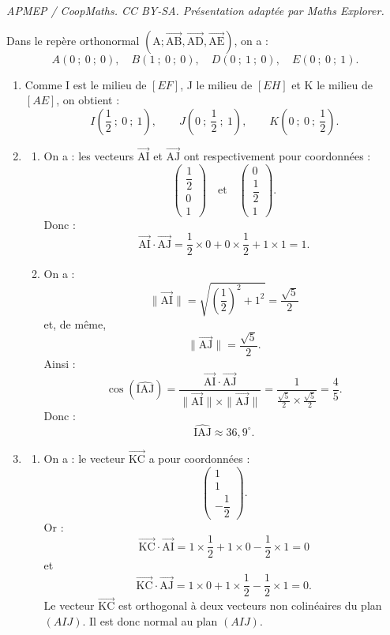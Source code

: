\documentclass[10pt]{article}
\providecommand{\vectt}[1]{\overrightarrow{\mathrm{#1}}}
\begin{document}
\noindent\textit{APMEP / CoopMaths. CC BY-SA. Présentation adaptée par Maths Explorer.}\par\medskip
Dans le repère orthonormal $\left(\mathrm{A};\vectt{AB},\vectt{AD},\vectt{AE}\right)$, on a :
\[
A(0~;~0~;~0),\quad B(1~;~0~;~0),\quad D(0~;~1~;~0),\quad E(0~;~0~;~1).
\]

\begin{enumerate}
	\item Comme I est le milieu de $[EF]$, J le milieu de $[EH]$ et K le milieu de $[AE]$, on obtient :
	\[
	I\left(\dfrac12~;~0~;~1\right),\qquad
	J\left(0~;~\dfrac12~;~1\right),\qquad
	K\left(0~;~0~;~\dfrac12\right).
	\]

	\item \begin{enumerate}
		\item On a :
		les vecteurs $\vectt{AI}$ et $\vectt{AJ}$ ont respectivement pour coordonnées :
		\[
		\begin{pmatrix}\dfrac12\\0\\1\end{pmatrix}
		\quad\text{et}\quad
		\begin{pmatrix}0\\\dfrac12\\1\end{pmatrix}.
		\]
		Donc :
		\[
		\vectt{AI}\cdot\vectt{AJ}
		=\dfrac12\times 0+0\times\dfrac12+1\times 1=1.
		\]

		\item On a :
		\[
		\|\vectt{AI}\|=\sqrt{\left(\dfrac12\right)^2+1^2}=\dfrac{\sqrt5}{2}
		\]
		et, de même,
		\[
		\|\vectt{AJ}\|=\dfrac{\sqrt5}{2}.
		\]
		Ainsi :
		\[
		\cos\left(\widehat{\mathrm{IAJ}}\right)
		=\dfrac{\vectt{AI}\cdot\vectt{AJ}}{\|\vectt{AI}\|\times \|\vectt{AJ}\|}
		=\dfrac{1}{\frac{\sqrt5}{2}\times \frac{\sqrt5}{2}}
		=\dfrac45.
		\]
		Donc :
		\[
		\widehat{\mathrm{IAJ}}\approx 36,9^\circ.
		\]
	\end{enumerate}

	\item \begin{enumerate}
		\item On a :
		le vecteur $\vectt{KC}$ a pour coordonnées :
		\[
		\begin{pmatrix}1\\1\\-\dfrac12\end{pmatrix}.
		\]
		Or :
		\[
		\vectt{KC}\cdot\vectt{AI}
		=1\times\dfrac12+1\times 0-\dfrac12\times 1=0
		\]
		et
		\[
		\vectt{KC}\cdot\vectt{AJ}
		=1\times 0+1\times\dfrac12-\dfrac12\times 1=0.
		\]
		Le vecteur $\vectt{KC}$ est orthogonal à deux vecteurs non colinéaires du plan $(AIJ)$.
		Il est donc normal au plan $(AIJ)$.


\end{enumerate}
\end{enumerate}
\end{document}
